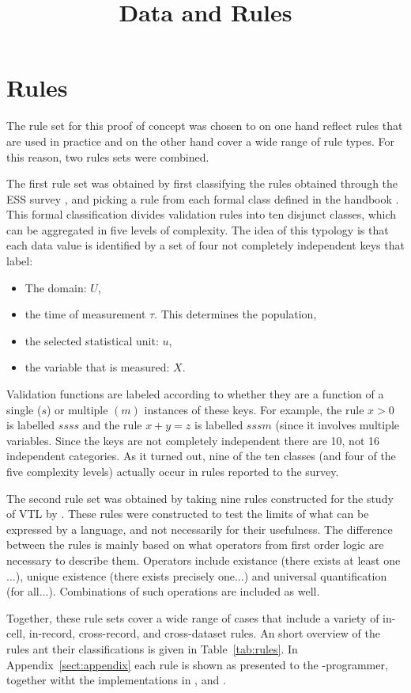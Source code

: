 \title{Data and Rules}
\label{datarules}

\section{Rules}
The rule set for this proof of concept was chosen to on one hand reflect rules
that are used in practice and on the other hand cover a wide range of rule
types.  For this reason, two rules sets were combined. 

The first rule set was obtained by first classifying the rules obtained through
the ESS survey \citep{walsdorfer:2015}, and picking a rule from each formal
class defined in the handbook \citep{loo:2015c, zio:2015}. This formal
classification divides validation rules into ten disjunct classes,
which can be aggregated in five levels of complexity. 
The idea of this typology is that each data value
is identified by a set of four not completely independent keys that label:
\begin{itemize}
\item The domain: $U$,
\item the time of measurement $\tau$. This determines the population,
\item the selected statistical unit: $u$,
\item the variable that is measured: $X$.
\end{itemize}
Validation functions are labeled according to whether they are a function of a
single ($s$) or multiple $(m)$ instances of these keys. For example, the rule
$x > 0$ is labelled $ssss$ and the rule $x + y = z$ is labelled $sssm$  (since
it involves multiple variables. Since the keys are not completely independent
there are 10, not 16 independent categories.  As it turned out, nine of the ten
classes (and four of the five complexity levels) actually occur in rules
reported to the survey.

The second rule set was obtained by taking nine rules constructed for the study
of VTL by \cite{gelsema:2015}. These rules were constructed to test the limits
of what can be expressed by a language, and not necessarily for their
usefulness. The difference between the rules is mainly based on what operators
from first order logic are necessary to describe them. Operators include
existance (there exists at least one$\ldots$), unique existence (there exists
precisely one$\ldots$) and universal quantification (for all$\ldots$).
Combinations of such operations are included as well.

Together, these rule sets cover a wide range of cases that include a variety of
in-cell, in-record, cross-record, and cross-dataset rules. An short overview of
the rules ant their classifications is given in Table~\ref{tab:rules}.  In
Appendix~\ref{sect:appendix} each rule is shown as presented to the
-programmer, together witht the implementations in ,
 and .




